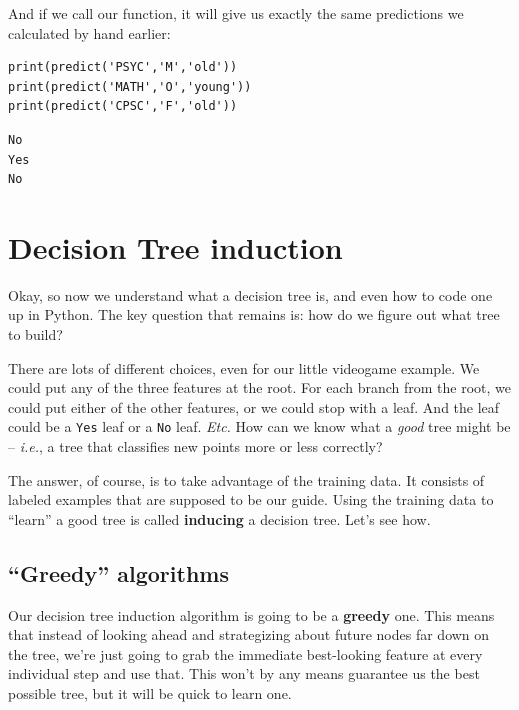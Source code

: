 \begin{samepage}
And if we call our function, it will give us exactly the same predictions we
calculated by hand earlier:

\begin{Verbatim}[fontsize=\footnotesize,samepage=true,frame=single,framesep=3mm]
print(predict('PSYC','M','old'))
print(predict('MATH','O','young'))
print(predict('CPSC','F','old'))
\end{Verbatim}
\vspace{-.2in}

\begin{Verbatim}[fontsize=\footnotesize,samepage=true,frame=leftline,framesep=5mm,framerule=1mm]
No
Yes
No
\end{Verbatim}
\end{samepage}

\section{Decision Tree induction}

Okay, so now we understand what a decision tree is, and even how to code one up
in Python. The key question that remains is: how do we figure out what tree to
build?

There are lots of different choices, even for our little videogame example. We
could put any of the three features at the root. For each branch from the root,
we could put either of the other features, or we could stop with a leaf. And
the leaf could be a \texttt{Yes} leaf or a \texttt{No} leaf. \textit{Etc.} How
can we know what a \textit{good} tree might be -- \textit{i.e.}, a tree that
classifies new points more or less correctly?


The answer, of course, is to take advantage of the training data. It consists
of labeled examples that are supposed to be our guide. Using the training data
to ``learn'' a good tree is called \textbf{inducing} a decision tree. Let's see
how.

\subsection{``Greedy'' algorithms}


Our decision tree induction algorithm is going to be a \textbf{greedy} one.
This means that instead of looking ahead and strategizing about future nodes
far down on the tree, we're just going to grab the immediate best-looking
feature at every individual step and use that. This won't by any means
guarantee us the best possible tree, but it will be quick to learn one.

